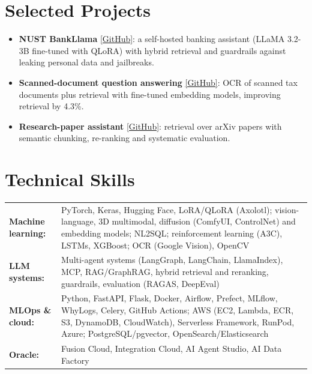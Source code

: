 \documentclass[10pt,letterpaper]{article}
\begin{document}
\section{Selected Projects}
\begin{itemize}
  \item \textbf{NUST BankLlama} \href{https://github.com/AreebAhmad-02/Financial-banking-rag-finetuning}{[GitHub]}: a self-hosted banking assistant (LLaMA 3.2-3B fine-tuned with QLoRA) with hybrid retrieval and guardrails against leaking personal data and jailbreaks.
  \item \textbf{Scanned-document question answering} \href{https://github.com/AreebAhmad-02/Embedding-Models-Finetuning}{[GitHub]}: OCR of scanned tax documents plus retrieval with fine-tuned embedding models, improving retrieval by 4.3\%.
  \item \textbf{Research-paper assistant} \href{https://github.com/AreebAhmad-02/Real-time-rag-pipeline-for-rag-research-papers}{[GitHub]}: retrieval over arXiv papers with semantic chunking, re-ranking and systematic evaluation.
\end{itemize}

\section{Technical Skills}
\begin{tabularx}{\textwidth}{@{}l X@{}}
  \textbf{Machine learning:} & PyTorch, Keras, Hugging Face, LoRA/QLoRA (Axolotl); vision-language, 3D multimodal, diffusion (ComfyUI, ControlNet) and embedding models; NL2SQL; reinforcement learning (A3C), LSTMs, XGBoost; OCR (Google Vision), OpenCV \\
  \textbf{LLM systems:} & Multi-agent systems (LangGraph, LangChain, LlamaIndex), MCP, RAG/GraphRAG, hybrid retrieval and reranking, guardrails, evaluation (RAGAS, DeepEval) \\
  \textbf{MLOps \& cloud:} & Python, FastAPI, Flask, Docker, Airflow, Prefect, MLflow, WhyLogs, Celery, GitHub Actions; AWS (EC2, Lambda, ECR, S3, DynamoDB, CloudWatch), Serverless Framework, RunPod, Azure; PostgreSQL/pgvector, OpenSearch/Elasticsearch \\
  \textbf{Oracle:} & Fusion Cloud, Integration Cloud, AI Agent Studio, AI Data Factory \\
\end{tabularx}


\end{document}
